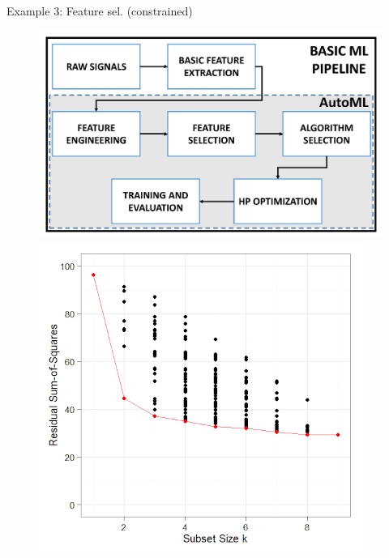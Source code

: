 \documentclass[11pt,compress,t,notes=noshow, xcolor=table]{beamer}
\begin{document}
\begin{vbframe}{Example 3: Feature sel. (constrained)}
\begin{figure}[!tbp]
  \centering
  \begin{minipage}[b]{0.5\textwidth}
    \includegraphics[width =\textwidth]{figure_man/pipeline.png}
  \end{minipage}
  \hfill
  \begin{minipage}[b]{0.4\textwidth}
    \includegraphics[width =\textwidth]{figure_man/subsetsize.png}
  \end{minipage}
\end{figure}


\framebreak

\lz 


\end{vbframe}
\end{document}
